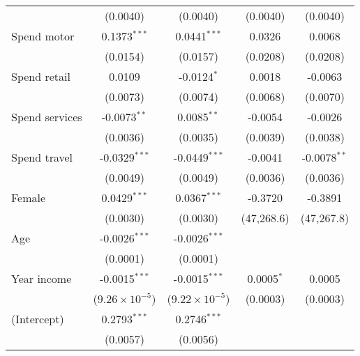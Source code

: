 \begin{table}[htbp]
\begin{scriptsize}
\begin{tabular}{lcccc}
                                     & (0.0040)                & (0.0040)                & (0.0040)       & (0.0040)\\
         Spend motor                 & 0.1373$^{***}$          & 0.0441$^{***}$          & 0.0326         & 0.0068\\
                                     & (0.0154)                & (0.0157)                & (0.0208)       & (0.0208)\\
         Spend retail                & 0.0109                  & -0.0124$^{*}$           & 0.0018         & -0.0063\\
                                     & (0.0073)                & (0.0074)                & (0.0068)       & (0.0070)\\
         Spend services              & -0.0073$^{**}$          & 0.0085$^{**}$           & -0.0054        & -0.0026\\
                                     & (0.0036)                & (0.0035)                & (0.0039)       & (0.0038)\\
         Spend travel                & -0.0329$^{***}$         & -0.0449$^{***}$         & -0.0041        & -0.0078$^{**}$\\
                                     & (0.0049)                & (0.0049)                & (0.0036)       & (0.0036)\\
         Female                      & 0.0429$^{***}$          & 0.0367$^{***}$          & -0.3720        & -0.3891\\
                                     & (0.0030)                & (0.0030)                & (47,268.6)     & (47,267.8)\\
         Age                         & -0.0026$^{***}$         & -0.0026$^{***}$         &                &   \\
                                     & (0.0001)                & (0.0001)                &                &   \\
         Year income                 & -0.0015$^{***}$         & -0.0015$^{***}$         & 0.0005$^{*}$   & 0.0005\\
                                     & ($9.26\times 10^{-5}$) & ($9.22\times 10^{-5}$) & (0.0003)       & (0.0003)\\
         (Intercept)                 & 0.2793$^{***}$          & 0.2746$^{***}$          &                &   \\
                                     & (0.0057)                & (0.0056)                &                &   \\

\end{tabular}
\end{scriptsize}
\end{table}
